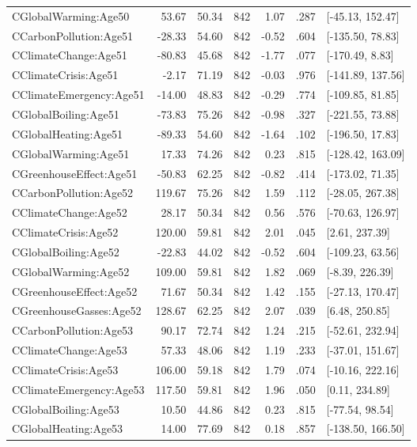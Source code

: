 \begin{table}[ht]
\begin{tabular}{lrrrrrl}
  CGlobalWarming:Age50 & 53.67 & 50.34 & 842 & 1.07 & .287 & [-45.13, 152.47] \\ 
  CCarbonPollution:Age51 & -28.33 & 54.60 & 842 & -0.52 & .604 & [-135.50, 78.83] \\ 
  CClimateChange:Age51 & -80.83 & 45.68 & 842 & -1.77 & .077 & [-170.49, 8.83] \\ 
  CClimateCrisis:Age51 & -2.17 & 71.19 & 842 & -0.03 & .976 & [-141.89, 137.56] \\ 
  CClimateEmergency:Age51 & -14.00 & 48.83 & 842 & -0.29 & .774 & [-109.85, 81.85] \\ 
  CGlobalBoiling:Age51 & -73.83 & 75.26 & 842 & -0.98 & .327 & [-221.55, 73.88] \\ 
  CGlobalHeating:Age51 & -89.33 & 54.60 & 842 & -1.64 & .102 & [-196.50, 17.83] \\ 
  CGlobalWarming:Age51 & 17.33 & 74.26 & 842 & 0.23 & .815 & [-128.42, 163.09] \\ 
  CGreenhouseEffect:Age51 & -50.83 & 62.25 & 842 & -0.82 & .414 & [-173.02, 71.35] \\ 
  CCarbonPollution:Age52 & 119.67 & 75.26 & 842 & 1.59 & .112 & [-28.05, 267.38] \\ 
  CClimateChange:Age52 & 28.17 & 50.34 & 842 & 0.56 & .576 & [-70.63, 126.97] \\ 
  CClimateCrisis:Age52 & 120.00 & 59.81 & 842 & 2.01 & .045 & [2.61, 237.39] \\ 
  CGlobalBoiling:Age52 & -22.83 & 44.02 & 842 & -0.52 & .604 & [-109.23, 63.56] \\ 
  CGlobalWarming:Age52 & 109.00 & 59.81 & 842 & 1.82 & .069 & [-8.39, 226.39] \\ 
  CGreenhouseEffect:Age52 & 71.67 & 50.34 & 842 & 1.42 & .155 & [-27.13, 170.47] \\ 
  CGreenhouseGasses:Age52 & 128.67 & 62.25 & 842 & 2.07 & .039 & [6.48, 250.85] \\ 
  CCarbonPollution:Age53 & 90.17 & 72.74 & 842 & 1.24 & .215 & [-52.61, 232.94] \\ 
  CClimateChange:Age53 & 57.33 & 48.06 & 842 & 1.19 & .233 & [-37.01, 151.67] \\ 
  CClimateCrisis:Age53 & 106.00 & 59.18 & 842 & 1.79 & .074 & [-10.16, 222.16] \\ 
  CClimateEmergency:Age53 & 117.50 & 59.81 & 842 & 1.96 & .050 & [0.11, 234.89] \\ 
  CGlobalBoiling:Age53 & 10.50 & 44.86 & 842 & 0.23 & .815 & [-77.54, 98.54] \\ 
  CGlobalHeating:Age53 & 14.00 & 77.69 & 842 & 0.18 & .857 & [-138.50, 166.50] \\ 

\end{tabular}
\end{table}
